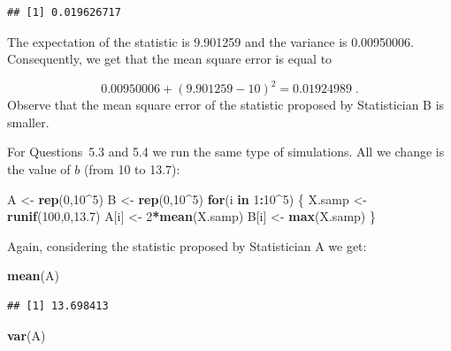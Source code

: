 \documentclass[]{krantz}
\makeatletter
\newenvironment{Shaded}{\begin{snugshade}}{\end{snugshade}}
\newcommand{\ControlFlowTok}[1]{\textcolor[rgb]{0.13,0.29,0.53}{\textbf{#1}}}
\newcommand{\DecValTok}[1]{\textcolor[rgb]{0.00,0.00,0.81}{#1}}
\newcommand{\FloatTok}[1]{\textcolor[rgb]{0.00,0.00,0.81}{#1}}
\newcommand{\KeywordTok}[1]{\textcolor[rgb]{0.13,0.29,0.53}{\textbf{#1}}}
\newcommand{\NormalTok}[1]{#1}
\newcommand{\OperatorTok}[1]{\textcolor[rgb]{0.81,0.36,0.00}{\textbf{#1}}}
\newcommand{\StringTok}[1]{\textcolor[rgb]{0.31,0.60,0.02}{#1}}
\newenvironment{kframe}{%
\medskip{}
\setlength{\fboxsep}{.8em}
 \def\at@end@of@kframe{}%
 \ifinner\ifhmode%
  \def\at@end@of@kframe{\end{minipage}}%
  \begin{minipage}{\columnwidth}%
 \fi\fi%
 \def\FrameCommand##1{\hskip\@totalleftmargin \hskip-\fboxsep
 \colorbox{shadecolor}{##1}\hskip-\fboxsep
     \hskip-\linewidth \hskip-\@totalleftmargin \hskip\columnwidth}%
 \MakeFramed {\advance\hsize-\width
   \@totalleftmargin\z@ \linewidth\hsize
   \@setminipage}}%
 {\par\unskip\endMakeFramed%
 \at@end@of@kframe}
\renewenvironment{Shaded}{\begin{kframe}}{\end{kframe}}
\theoremstyle{definition}
\theoremstyle{definition}
\theoremstyle{definition}
\theoremstyle{remark}
\makeatother
\begin{document}
\begin{verbatim}
## [1] 0.019626717
\end{verbatim}

The expectation of the statistic is 9.901259 and the variance is
0.00950006. Consequently, we get that the mean square error is equal to

\[0.00950006 + (9.901259 - 10)^2 = 0.01924989\;.\] Observe that the mean
square error of the statistic proposed by Statistician B is smaller.

For Questions~5.3 and 5.4 we run the same type of simulations. All we
change is the value of \(b\) (from 10 to 13.7):

\begin{Shaded}
\begin{Highlighting}[]
\NormalTok{A <-}\StringTok{ }\KeywordTok{rep}\NormalTok{(}\DecValTok{0}\NormalTok{,}\DecValTok{10}\OperatorTok{^}\DecValTok{5}\NormalTok{)}
\NormalTok{B <-}\StringTok{ }\KeywordTok{rep}\NormalTok{(}\DecValTok{0}\NormalTok{,}\DecValTok{10}\OperatorTok{^}\DecValTok{5}\NormalTok{)}
\ControlFlowTok{for}\NormalTok{(i }\ControlFlowTok{in} \DecValTok{1}\OperatorTok{:}\DecValTok{10}\OperatorTok{^}\DecValTok{5}\NormalTok{) \{}
\NormalTok{  X.samp <-}\StringTok{ }\KeywordTok{runif}\NormalTok{(}\DecValTok{100}\NormalTok{,}\DecValTok{0}\NormalTok{,}\FloatTok{13.7}\NormalTok{)}
\NormalTok{  A[i] <-}\StringTok{ }\DecValTok{2}\OperatorTok{*}\KeywordTok{mean}\NormalTok{(X.samp)}
\NormalTok{  B[i] <-}\StringTok{ }\KeywordTok{max}\NormalTok{(X.samp)}
\NormalTok{\}}
\end{Highlighting}
\end{Shaded}

Again, considering the statistic proposed by Statistician A we get:

\begin{Shaded}
\begin{Highlighting}[]
\KeywordTok{mean}\NormalTok{(A)}
\end{Highlighting}
\end{Shaded}

\begin{verbatim}
## [1] 13.698413
\end{verbatim}

\begin{Shaded}
\begin{Highlighting}[]
\KeywordTok{var}\NormalTok{(A)}
\end{Highlighting}
\end{Shaded}
\end{document}
